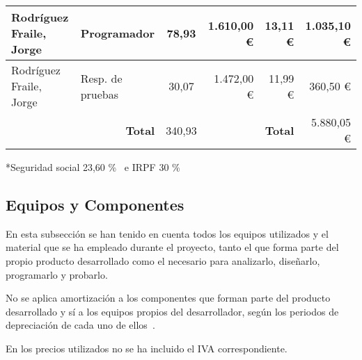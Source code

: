 \begin{table}[H]
{\begin{tabular}{ll|c|rr|r|}
			\multicolumn{1}{|l|}{Rodríguez Fraile, Jorge}                             & Programador                                                 & 78,93                                   & \multicolumn{1}{r|}{1.610,00 €}                              & 13,11 €                                                                              & 1.035,10 €                                                                           \\ \hline
			\multicolumn{1}{|l|}{Rodríguez Fraile, Jorge}                             & Resp. de pruebas                                            & 30,07                                   & \multicolumn{1}{r|}{1.472,00 €}                              & 11,99 €                                                                              & 360,50   €                                                                           \\ \hline
			                                                                          & \multicolumn{1}{r|}{\textbf{Total}}                         & 340,93                                  & \multicolumn{1}{l}{}                                         & \textbf{Total}                                                                       & 5.880,05 €                                                                           \\ \cline{3-3} \cline{6-6}
		\end{tabular}%
	}
\end{table}

*Seguridad social 23,60 \%~\cite{ministerio_de_inclusion_seguridad_social_y_migraciones_bases_nodate} e IRPF 30 \%~\cite{trecet_irpf_nodate}

\subsection{Equipos y Componentes}\label{subsec:equipos-y-componentes}
En esta subsección se han tenido en cuenta todos los equipos utilizados y el material que se ha empleado durante el proyecto, tanto el que forma parte del propio producto desarrollado como el necesario para analizarlo, diseñarlo, programarlo y probarlo.

No se aplica amortización a los componentes que forman parte del producto desarrollado y sí a los equipos propios del desarrollador, según los periodos de depreciación de cada uno de ellos~\cite{thiebaud_-muller_service_2018}.

En los precios utilizados no se ha incluido el IVA correspondiente.

